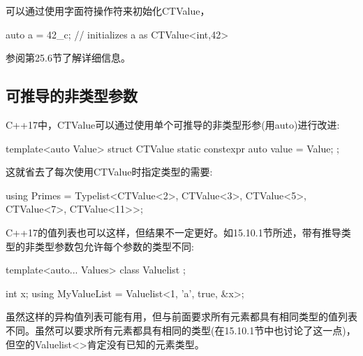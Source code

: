 可以通过使用字面符操作符来初始化CTValue，

\begin{cpp}
auto a = 42_c; // initializes a as CTValue<int,42>
\end{cpp}

参阅第25.6节了解详细信息。

\subsection{可推导的非类型参数}

C++17中，CTValue可以通过使用单个可推导的非类型形参(用auto)进行改进:

\begin{cpp}
template<auto Value>
struct CTValue
{
	static constexpr auto value = Value;
};
\end{cpp}

这就省去了每次使用CTValue时指定类型的需要:

\begin{cpp}
using Primes = Typelist<CTValue<2>, CTValue<3>, CTValue<5>,
						CTValue<7>, CTValue<11>>;
\end{cpp}

C++17的值列表也可以这样，但结果不一定更好。如15.10.1节所述，带有推导类型的非类型参数包允许每个参数的类型不同:

\begin{cpp}
template<auto... Values>
class Valuelist { };

int x;
using MyValueList = Valuelist<1, ’a’, true, &x>;
\end{cpp}

虽然这样的异构值列表可能有用，但与前面要求所有元素都具有相同类型的值列表不同。虽然可以要求所有元素都具有相同的类型(在15.10.1节中也讨论了这一点)，但空的Valuelist<>肯定没有已知的元素类型。













